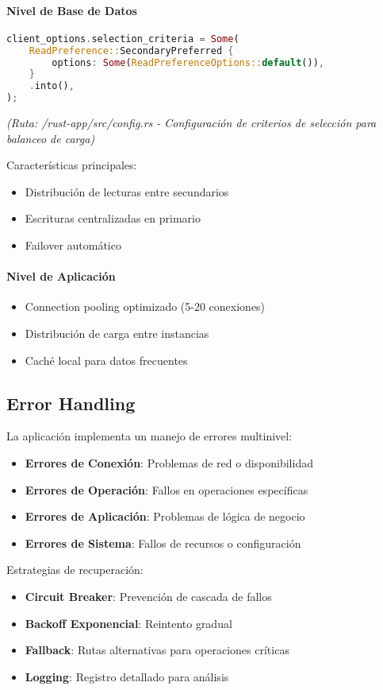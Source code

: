 \documentclass[12pt,letterpaper]{article}
\begin{document}
\paragraph{Nivel de Base de Datos}
\begin{lstlisting}[language=rust]
client_options.selection_criteria = Some(
    ReadPreference::SecondaryPreferred {
        options: Some(ReadPreferenceOptions::default()),
    }
    .into(),
);
\end{lstlisting}
\textit{(Ruta: /rust-app/src/config.rs - Configuración de criterios de selección para balanceo de carga)}

Características principales:
\begin{itemize}
    \item Distribución de lecturas entre secundarios
    \item Escrituras centralizadas en primario
    \item Failover automático
\end{itemize}

\paragraph{Nivel de Aplicación}
\begin{itemize}
    \item Connection pooling optimizado (5-20 conexiones)
    \item Distribución de carga entre instancias
    \item Caché local para datos frecuentes
\end{itemize}

\subsection{Error Handling}
La aplicación implementa un manejo de errores multinivel:

\begin{itemize}
    \item \textbf{Errores de Conexión}: Problemas de red o disponibilidad
    \item \textbf{Errores de Operación}: Fallos en operaciones específicas
    \item \textbf{Errores de Aplicación}: Problemas de lógica de negocio
    \item \textbf{Errores de Sistema}: Fallos de recursos o configuración
\end{itemize}

Estrategias de recuperación:
\begin{itemize}
    \item \textbf{Circuit Breaker}: Prevención de cascada de fallos
    \item \textbf{Backoff Exponencial}: Reintento gradual
    \item \textbf{Fallback}: Rutas alternativas para operaciones críticas
    \item \textbf{Logging}: Registro detallado para análisis
\end{itemize}
\end{document}
